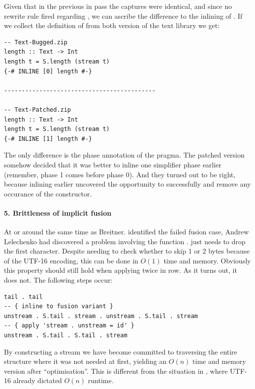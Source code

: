 Given that in the previous in pass the captures were identical, and since no rewrite rule fired regarding ,
we can ascribe the difference to the inlining of . If we collect the definition of  from both version
of the text library we get:

\begin{listing}[H]
\begin{verbatim}
-- Text-Bugged.zip
length :: Text -> Int
length t = S.length (stream t)
{-# INLINE [0] length #-}

-------------------------------------------

-- Text-Patched.zip
length :: Text -> Int
length t = S.length (stream t)
{-# INLINE [1] length #-}
\end{verbatim}
\end{listing}

The only difference is the phase annotation of the  pragma. The patched version somehow decided that it was better
to inline  one simplifier phase earlier (remember, phase 1 comes before phase 0). And they turned out to be right,
because inlining earlier uncovered the opportunity to successfully and remove any occurance of the  constructor.

\paragraph{5. Brittleness of implicit fusion}
At or around the same time as Breitner. \cite{inspection_testing} identified the failed fusion case, Andrew Lelechenko had discovered
a problem involving the  function \cite{two_tails}.  just needs to drop the first character.
Despite needing to check whether to skip 1 or 2 bytes because of the UTF-16 encoding, this can be done in $O(1)$ time and memory.
Obviously this property should still hold when applying  twice in row. As it turns out, it does not. The following steps occur:

\begin{listing}[H]
\begin{verbatim}
tail . tail
-- { inline to fusion variant }
unstream . S.tail . stream . unstream . S.tail . stream
-- { apply 'stream . unstream = id' }
unstream . S.tail . S.tail . stream
\end{verbatim}
\end{listing}

By constructing a stream we have become committed to traversing the entire structure where it was not needed at first,
yielding an $O(n)$ time and memory version after ``optimisation''. This is different from the situation in ,
where UTF-16 already dictated $O(n)$ runtime.

